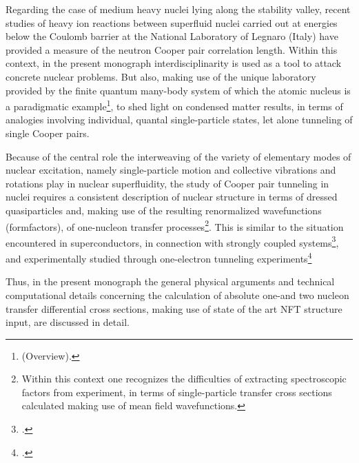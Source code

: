 Regarding the case of medium heavy nuclei lying along the stability valley, recent studies of heavy ion reactions between superfluid nuclei carried out at energies below the Coulomb barrier at the National Laboratory of Legnaro (Italy) have provided a measure of the neutron Cooper pair correlation length. Within this context, in the present monograph interdisciplinarity is used as a tool to attack concrete nuclear problems. But also, making use of the unique laboratory provided by the finite quantum many-body system of which the atomic nucleus is a paradigmatic example\footnote{\cite{Bohr:19} (Overview).}, to shed light on condensed matter results, in terms of analogies involving individual, quantal single-particle states, let alone tunneling of single Cooper pairs.


Because of the central role the interweaving of the variety of elementary modes of nuclear excitation, namely single-particle motion and collective vibrations and rotations play in nuclear superfluidity, the study of Cooper pair tunneling in nuclei requires  a consistent description of nuclear structure in terms of dressed quasiparticles and, making use of the resulting renormalized wavefunctions (formfactors),  of one-nucleon transfer processes\footnote{Within this context one recognizes the difficulties of extracting spectroscopic factors from experiment, in terms of single-particle transfer cross sections calculated making use of mean field wavefunctions.}. This is similar to the situation encountered in superconductors, in connection with strongly coupled systems\footnote{\cite{Eliashberg:60}.}, and experimentally studied through one-electron tunneling experiments\footnote{\cite{Giaver:73}.} 

Thus, in the present monograph the general physical arguments and technical computational details concerning the   calculation of  absolute one-and two nucleon  transfer differential cross sections, making use of state of the art NFT structure input, are discussed in detail. 


